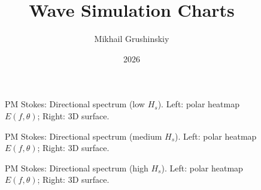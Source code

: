 \documentclass[11pt,letterpaper]{article}
\title{Wave Simulation Charts}
\author{Mikhail Grushinskiy}
\date{2026}
\begin{document}
    \maketitle



    \begin{figure}[H]\centering
    \begin{minipage}{0.49\textwidth}
        \resizebox{\linewidth}{!}{}
    \end{minipage}\hfill
    \begin{minipage}{0.49\textwidth}
        \resizebox{\linewidth}{!}{}
    \end{minipage}
    \caption{PM Stokes: Directional spectrum (low $H_s$). Left: polar heatmap $E(f,\theta)$; Right: 3D surface.}
    \label{fig:pmstokes_spec_low}
    \end{figure}

    \begin{figure}[H]\centering
    \begin{minipage}{0.49\textwidth}
        \resizebox{\linewidth}{!}{}
    \end{minipage}\hfill
    \begin{minipage}{0.49\textwidth}
        \resizebox{\linewidth}{!}{}
    \end{minipage}
    \caption{PM Stokes: Directional spectrum (medium $H_s$). Left: polar heatmap $E(f,\theta)$; Right: 3D surface.}
    \label{fig:pmstokes_spec_medium}
    \end{figure}

    \begin{figure}[H]\centering
    \begin{minipage}{0.49\textwidth}
        \resizebox{\linewidth}{!}{}
    \end{minipage}\hfill
    \begin{minipage}{0.49\textwidth}
        \resizebox{\linewidth}{!}{}
    \end{minipage}
    \caption{PM Stokes: Directional spectrum (high $H_s$). Left: polar heatmap $E(f,\theta)$; Right: 3D surface.}
    \label{fig:pmstokes_spec_high}
    \end{figure}
\end{document}
